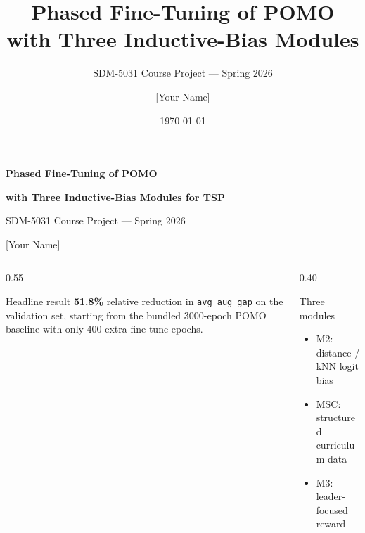 \documentclass[aspectratio=169,11pt]{beamer}
\title{Phased Fine-Tuning of POMO with Three Inductive-Bias Modules}
\subtitle{SDM-5031 Course Project --- Spring 2026}
\author{[Your Name]}
\date{\today}
\begin{document}
\begin{frame}[plain]
  \vspace{0.5cm}
  {\color{sdmblue}\LARGE\textbf{Phased Fine-Tuning of POMO}\par}
  \vspace{0.1cm}
  {\color{sdmblue}\Large\textbf{with Three Inductive-Bias Modules for TSP}\par}
  \vspace{0.6cm}
  {\large SDM-5031 Course Project --- Spring 2026\par}
  \vspace{0.4cm}
  {[Your Name]\par}

  \vspace{1.0cm}
  \begin{columns}[T,totalwidth=\textwidth]
    \begin{column}{0.55\textwidth}
      \begin{block}{Headline result}
        \textbf{51.8\%} relative reduction in \texttt{avg\_aug\_gap}
        on the validation set, starting from the bundled
        3000-epoch POMO baseline with only 400 extra fine-tune epochs.
      \end{block}
    \end{column}
    \begin{column}{0.40\textwidth}
      \begin{alertblock}{Three modules}
        \begin{itemize}
          \item M2: distance / kNN logit bias
          \item MSC: structured curriculum data
          \item M3: leader-focused reward
        \end{itemize}
      \end{alertblock}
    \end{column}
  \end{columns}
  \vfill
\end{frame}
\end{document}
